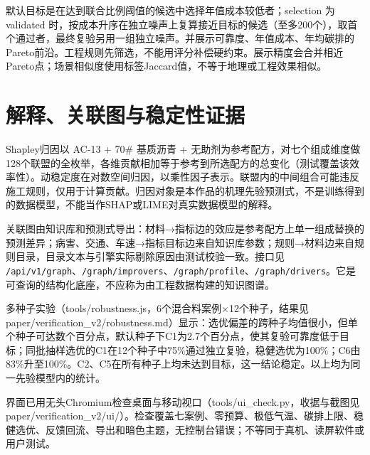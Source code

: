 \documentclass[UTF8,fontset=none,zihao=-4,a4paper]{ctexart}
\begin{document}
默认目标是在达到联合比例阈值的候选中选择年值成本较低者；selection 为 validated 时，按成本升序在独立噪声上复算接近目标的候选（至多200个），取首个通过者，最终复验另用一组独立噪声。并展示可靠度、年值成本、年均碳排的Pareto前沿。工程规则先筛选，不能用评分补偿硬约束。展示精度会合并相近Pareto点；场景相似度使用标签Jaccard值，不等于地理或工程效果相似。

\section*{解释、关联图与稳定性证据}
Shapley归因以 AC-13 + 70\# 基质沥青 + 无助剂为参考配方，对七个组成维度做128个联盟的全枚举，各维贡献相加等于参考到所选配方的总变化（测试覆盖该效率性）。动稳定度在对数空间归因，以乘性因子表示。联盟内的中间组合可能违反施工规则，仅用于计算贡献。归因对象是本作品的机理先验预测式，不是训练得到的数据模型，不能当作SHAP或LIME对真实数据模型的解释。

关联图由知识库和预测式导出：材料→指标边的效应是参考配方上单一组成替换的预测差异；病害、交通、车速→指标目标边来自知识库参数；规则→材料边来自规则目录，目录文本与引擎实际剔除原因由测试校验一致。接口见 \texttt{/\allowbreak{}api/\allowbreak{}v1/\allowbreak{}graph}、\texttt{/\allowbreak{}graph/\allowbreak{}improvers}、\texttt{/\allowbreak{}graph/\allowbreak{}profile}、\texttt{/\allowbreak{}graph/\allowbreak{}drivers}。它是可查询的结构化底座，不应称为由工程数据构建的知识图谱。

多种子实验（tools/robustness.js，6个混合料案例×12个种子，结果见 paper/verification\_v2/robustness.md）显示：选优偏差的跨种子均值很小，但单个种子可达数个百分点，默认种子下C1为2.7个百分点，使其复验可靠度低于目标；同批抽样选优的C1在12个种子中75\%通过独立复验，稳健选优为100\%；C6由83\%升至100\%。C2、C5在所有种子上均未达到目标，这一结论稳定。以上均为同一先验模型内的统计。

界面已用无头Chromium检查桌面与移动视口（tools/ui\_check.py，收据与截图见 paper/verification\_v2/ui/）。检查覆盖七案例、零预算、极低气温、碳排上限、稳健选优、反馈回流、导出和暗色主题，无控制台错误；不等同于真机、读屏软件或用户测试。
\end{document}
